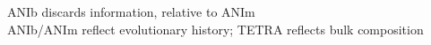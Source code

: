 \begin{frame}
\begin{columns}[T]
\begin{column}{5cm}
    \end{column}
  \end{columns}       
  ANIb discards information, relative to ANIm\\
  ANIb/ANIm reflect evolutionary history; TETRA reflects bulk composition
\end{frame}